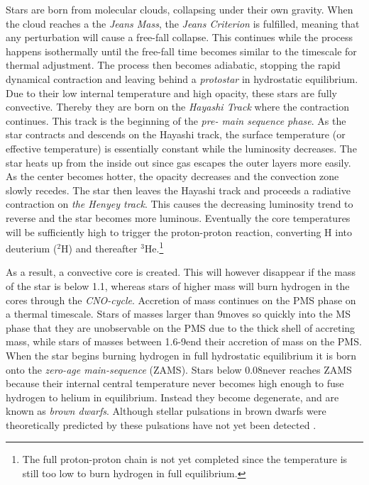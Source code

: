 Stars are born from molecular clouds, collapsing under their own gravity. When the cloud reaches a the \textit{Jeans Mass}, the \textit{Jeans Criterion} is fulfilled, meaning that any perturbation will cause a free-fall collapse. This continues while the process happens isothermally until the free-fall time becomes similar to the timescale for thermal adjustment. The process then becomes adiabatic, stopping the rapid dynamical contraction and leaving behind a \textit{protostar} in hydrostatic equilibrium. Due to their low internal temperature and high opacity, these stars are fully convective. Thereby they are born on the \textit{Hayashi Track} where the contraction continues. This track is the beginning of the \textit{pre- main sequence phase}. As the star contracts and descends on the Hayashi track, the surface temperature (or effective temperature) is essentially constant while the luminosity decreases. The star heats up from the inside out since gas escapes the outer layers more easily. As the center becomes hotter, the opacity decreases and the convection zone slowly recedes. The star then leaves the Hayashi track and proceeds a radiative contraction on \textit{the Henyey track}. This causes the decreasing luminosity trend to reverse and the star becomes more luminous. Eventually the core temperatures will be sufficiently high to trigger the proton-proton reaction, converting H into deuterium ($^{2}\text{H}$) and thereafter $^3\text{He}$.\footnote{The full proton-proton chain is not yet completed since the temperature is still too low to burn hydrogen in full equilibrium.} 


As a result, a convective core is created. This will however disappear if the mass of the star is below 1.1\msun, whereas stars of higher mass will burn hydrogen in the cores through the \textit{CNO-cycle}. Accretion of mass continues on the PMS phase on a thermal timescale. Stars of masses larger than 9\msun moves so quickly into the MS phase that they are unobservable on the PMS due to the thick shell of accreting mass, while stars of masses between 1.6-9\msun end their accretion of mass on the PMS. When the star begins burning hydrogen in full hydrostatic equilibrium it is born onto the \textit{zero-age main-sequence} (ZAMS). Stars below 0.08\msun never reaches ZAMS because their internal central temperature never becomes high enough to fuse hydrogen to helium in equilibrium. Instead they become degenerate, and are known as \textit{brown dwarfs}. Although stellar pulsations in brown dwarfs were theoretically predicted by \citet{palla2005pulsating} these pulsations have not yet been detected \citep{aerts2010, cody2014pulsation}. 

